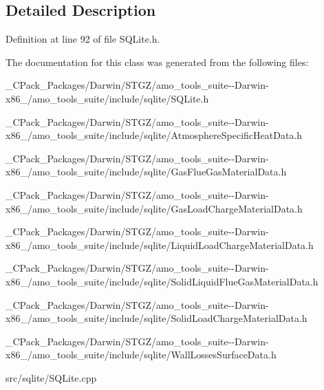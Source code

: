 \subsection{Detailed Description}


Definition at line 92 of file S\+Q\+Lite.\+h.



The documentation for this class was generated from the following files\+:\begin{DoxyCompactItemize}
\item 
\+\_\+\+C\+Pack\+\_\+\+Packages/\+Darwin/\+S\+T\+G\+Z/amo\+\_\+tools\+\_\+suite-\/-\/\+Darwin-\/x86\+\_/amo\+\_\+tools\+\_\+suite/include/sqlite/S\+Q\+Lite.\+h\item 
\+\_\+\+C\+Pack\+\_\+\+Packages/\+Darwin/\+S\+T\+G\+Z/amo\+\_\+tools\+\_\+suite-\/-\/\+Darwin-\/x86\+\_/amo\+\_\+tools\+\_\+suite/include/sqlite/Atmosphere\+Specific\+Heat\+Data.\+h\item 
\+\_\+\+C\+Pack\+\_\+\+Packages/\+Darwin/\+S\+T\+G\+Z/amo\+\_\+tools\+\_\+suite-\/-\/\+Darwin-\/x86\+\_/amo\+\_\+tools\+\_\+suite/include/sqlite/Gas\+Flue\+Gas\+Material\+Data.\+h\item 
\+\_\+\+C\+Pack\+\_\+\+Packages/\+Darwin/\+S\+T\+G\+Z/amo\+\_\+tools\+\_\+suite-\/-\/\+Darwin-\/x86\+\_/amo\+\_\+tools\+\_\+suite/include/sqlite/Gas\+Load\+Charge\+Material\+Data.\+h\item 
\+\_\+\+C\+Pack\+\_\+\+Packages/\+Darwin/\+S\+T\+G\+Z/amo\+\_\+tools\+\_\+suite-\/-\/\+Darwin-\/x86\+\_/amo\+\_\+tools\+\_\+suite/include/sqlite/Liquid\+Load\+Charge\+Material\+Data.\+h\item 
\+\_\+\+C\+Pack\+\_\+\+Packages/\+Darwin/\+S\+T\+G\+Z/amo\+\_\+tools\+\_\+suite-\/-\/\+Darwin-\/x86\+\_/amo\+\_\+tools\+\_\+suite/include/sqlite/Solid\+Liquid\+Flue\+Gas\+Material\+Data.\+h\item 
\+\_\+\+C\+Pack\+\_\+\+Packages/\+Darwin/\+S\+T\+G\+Z/amo\+\_\+tools\+\_\+suite-\/-\/\+Darwin-\/x86\+\_/amo\+\_\+tools\+\_\+suite/include/sqlite/Solid\+Load\+Charge\+Material\+Data.\+h\item 
\+\_\+\+C\+Pack\+\_\+\+Packages/\+Darwin/\+S\+T\+G\+Z/amo\+\_\+tools\+\_\+suite-\/-\/\+Darwin-\/x86\+\_/amo\+\_\+tools\+\_\+suite/include/sqlite/Wall\+Losses\+Surface\+Data.\+h\item 
src/sqlite/S\+Q\+Lite.\+cpp\end{DoxyCompactItemize}
